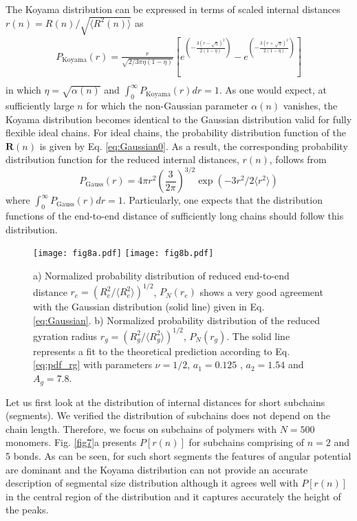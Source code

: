 \documentclass[pre,showpacs,notitlepage,twocolumn]{revtex4-1}
\newcommand{\bR}{\mathbf{R}}
\begin{document}
The Koyama distribution can be expressed  in terms of scaled internal distances $r(n)=R(n)/\sqrt{\langle R^2(n) \rangle}$  as
%
\begin{eqnarray}
 P_{\mathrm{Koyama}}(r)=\frac{r}{\sqrt{2/3 \pi \eta (1-\eta) }}
 [ e^{ \left(-\frac{3 (r -\sqrt{\eta})^2}{2 (1-\eta)}\right)}-e^{ \left(-\frac{3 (r +\sqrt{\eta})^2}{2 (1-\eta)}\right)} ]  \nonumber \\
 \label{eq:Koyama}
 \end{eqnarray}
%
in which  $\eta=\sqrt{\alpha (n)}$ and $\int_{0}^{\infty} P_{\mathrm{Koyama}}(r) dr=1 $. As one would expect, at sufficiently large $n$ for which the non-Gaussian parameter $\alpha (n)$ vanishes,
the Koyama distribution becomes identical to the Gaussian distribution valid for fully flexible ideal chains. For ideal chains, the probability distribution function of the   $\bR(n)$   is given by Eq. \eqref{eq:Gaussian0}.
As a result, the  corresponding probability distribution function  for the reduced internal distances, $r(n)$,   follows from
\begin{equation}
P_{\mathrm{Gauss}}(r)=4 \pi r^2 \left(\frac{3}{2 \pi } \right)^{3/2}  \exp(-3 r^2/2 \langle r^2 \rangle)  %
\label{eq:Gaussian}
\end{equation}
where $\int_{0}^{\infty} P_{\mathrm{Gauss}} (r) dr =1$.
 Particularly, one expects that the distribution functions of the end-to-end distance of sufficiently long chains should follow this distribution.
 
%
 \begin{figure*}[t]
\texttt{[image: fig8a.pdf]}
\texttt{[image: fig8b.pdf]}
\caption{a) Normalized probability distribution  of  reduced end-to-end distance $r_e=(R_e^2/ \langle R_e^2 \rangle)^{1/2}$, $P_N(r_e)$  shows a very good agreement with the  Gaussian distribution  (solid line)  given in   Eq. \eqref{eq:Gaussian}. b) Normalized probability distribution of the reduced  gyration radius $r_g=(R_g^2/ \langle R_g^2 \rangle)^{1/2}$, $P_N(r_g) $. The solid line represents a fit to the theoretical prediction  according to  Eq. \eqref{eq:pdf_rg} with  parameters $\nu=1/2$, $a_1=0.125$ , $a_2=1.54$ and $A_g=7.8$. }
\label{fig8} 
\end{figure*}
%
Let us  first look at the distribution of internal distances for short subchains (segments). We verified the distribution of subchains does not depend on the chain length. Therefore,
we focus on  subchains of polymers with  $N=500$ monomers.
Fig. \ref{fig7}a  presents   $P[r(n)]$ for subchains  comprising of $n=2$ and 5 bonds. As can be seen, for such short segments the features of angular potential are  dominant and the Koyama distribution 
can not provide an accurate description of segmental size distribution although it agrees well with  $P[r(n)]$ in the central region of the distribution and it   captures accurately the height of the
peaks.  
\end{document}
